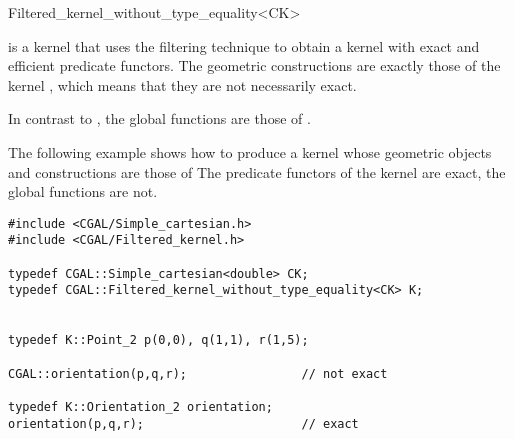 \begin{ccRefClass}{Filtered_kernel_without_type_equality<CK>}

\KernelRefLayout\gdef\ccTagOperatorLayout{\ccFalse}

\ccDefinition

\ccClassTemplateName is a kernel that uses the filtering technique
\cite{cgal:bbp-iayed-01} to obtain a kernel with exact and efficient
predicate functors.
The geometric constructions are exactly those
of the kernel , which means that they are not necessarily exact.

In contrast to , 
the global functions are those of .



\ccExample

The following example shows how to produce a kernel whose geometric
objects and constructions are those of 
The predicate functors of the kernel are exact, the global functions
are not.

\begin{verbatim}
#include <CGAL/Simple_cartesian.h>
#include <CGAL/Filtered_kernel.h>

typedef CGAL::Simple_cartesian<double> CK;
typedef CGAL::Filtered_kernel_without_type_equality<CK> K;


typedef K::Point_2 p(0,0), q(1,1), r(1,5);

CGAL::orientation(p,q,r);                // not exact

typedef K::Orientation_2 orientation;
orientation(p,q,r);                      // exact

\end{verbatim}


\end{ccRefClass}
